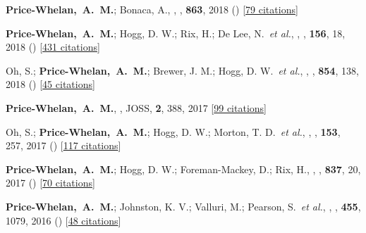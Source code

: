 \item[{\color{deemph}\scriptsize9}]\textbf{Price-Whelan,~A.~M.}; Bonaca, A., , \apj, \textbf{863}, 2018 () [\href{http://adsabs.harvard.edu/abs/2018ApJ...863L..20P}{79 citations}]

\item[{\color{deemph}\scriptsize8}]\textbf{Price-Whelan,~A.~M.}; Hogg, D. W.; Rix, H.; De Lee, N.~\textit{et al.}, , \aj, \textbf{156}, 18, 2018 () [\href{http://adsabs.harvard.edu/abs/2018AJ....156...18P}{431 citations}]

\item[{\color{deemph}\scriptsize7}]Oh, S.; \textbf{Price-Whelan,~A.~M.}; Brewer, J. M.; Hogg, D. W.~\textit{et al.}, , \apj, \textbf{854}, 138, 2018 () [\href{http://adsabs.harvard.edu/abs/2018ApJ...854..138O}{45 citations}]

\item[{\color{deemph}\scriptsize6}]\textbf{Price-Whelan,~A.~M.}, , JOSS, \textbf{2}, 388, 2017 [\href{http://adsabs.harvard.edu/abs/2017JOSS....2..388P}{99 citations}]

\item[{\color{deemph}\scriptsize5}]Oh, S.; \textbf{Price-Whelan,~A.~M.}; Hogg, D. W.; Morton, T. D.~\textit{et al.}, , \aj, \textbf{153}, 257, 2017 () [\href{http://adsabs.harvard.edu/abs/2017AJ....153..257O}{117 citations}]

\item[{\color{deemph}\scriptsize4}]\textbf{Price-Whelan,~A.~M.}; Hogg, D. W.; Foreman-Mackey, D.; Rix, H., , \apj, \textbf{837}, 20, 2017 () [\href{http://adsabs.harvard.edu/abs/2017ApJ...837...20P}{70 citations}]

\item[{\color{deemph}\scriptsize3}]\textbf{Price-Whelan,~A.~M.}; Johnston, K. V.; Valluri, M.; Pearson, S.~\textit{et al.}, , \mnras, \textbf{455}, 1079, 2016 () [\href{http://adsabs.harvard.edu/abs/2016MNRAS.455.1079P}{48 citations}]

